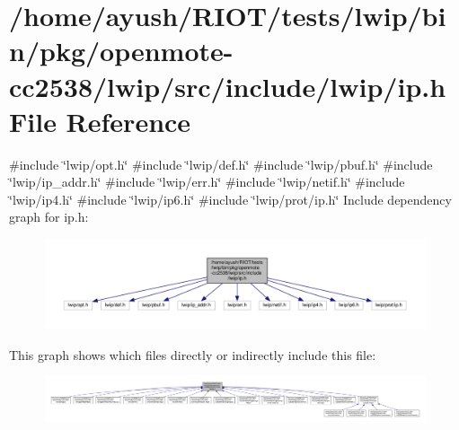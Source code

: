 \hypertarget{openmote-cc2538_2lwip_2src_2include_2lwip_2ip_8h}{}\section{/home/ayush/\+R\+I\+O\+T/tests/lwip/bin/pkg/openmote-\/cc2538/lwip/src/include/lwip/ip.h File Reference}
\label{openmote-cc2538_2lwip_2src_2include_2lwip_2ip_8h}
{\ttfamily \#include \char`\"{}lwip/opt.\+h\char`\"{}}\newline
{\ttfamily \#include \char`\"{}lwip/def.\+h\char`\"{}}\newline
{\ttfamily \#include \char`\"{}lwip/pbuf.\+h\char`\"{}}\newline
{\ttfamily \#include \char`\"{}lwip/ip\+\_\+addr.\+h\char`\"{}}\newline
{\ttfamily \#include \char`\"{}lwip/err.\+h\char`\"{}}\newline
{\ttfamily \#include \char`\"{}lwip/netif.\+h\char`\"{}}\newline
{\ttfamily \#include \char`\"{}lwip/ip4.\+h\char`\"{}}\newline
{\ttfamily \#include \char`\"{}lwip/ip6.\+h\char`\"{}}\newline
{\ttfamily \#include \char`\"{}lwip/prot/ip.\+h\char`\"{}}\newline
Include dependency graph for ip.\+h\+:
\nopagebreak
\begin{figure}[H]
\begin{center}
\leavevmode
\includegraphics[width=350pt]{openmote-cc2538_2lwip_2src_2include_2lwip_2ip_8h__incl}
\end{center}
\end{figure}
This graph shows which files directly or indirectly include this file\+:
\nopagebreak
\begin{figure}[H]
\begin{center}
\leavevmode
\includegraphics[width=350pt]{openmote-cc2538_2lwip_2src_2include_2lwip_2ip_8h__dep__incl}
\end{center}
\end{figure}
